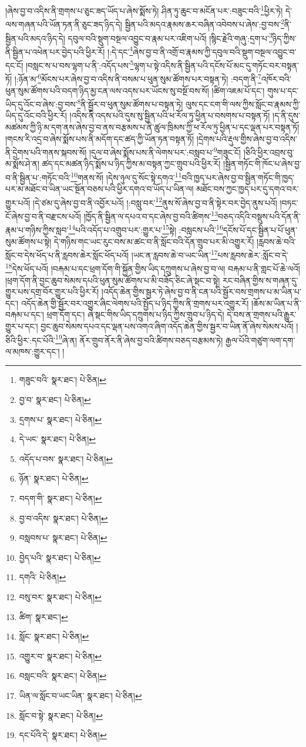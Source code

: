 །ཞེས་བྱ་བ་འདིས་ནི་གྲགས་པ་ཅུང་ཟད་ཡོད་པ་ཞེས་སྨོས་ཏེ། ཤིན་ཏུ་ཆུང་བ་མངོན་པར་:བཟུང་བའི་\footnote{གཟུང་བའི་  སྣར་ཐང་།  པེ་ཅིན། }ཕྱིར་ཏེ། དེ་ལས་གཞན་པའི་ཡོན་ཏན་ནི་ཅུང་ཟད་ཉིད་དེ། སྦྱིན་པའི་མདའ་རྣམས་ཆར་བཞིན་འབེབས་པ་ཞེས་:བྱ་བས་\footnote{བྱ་བ་  སྣར་ཐང་།  པེ་ཅིན། }ནི་སྦྱིན་པའི་མདའ་ཉིད་དེ། དབུལ་བའི་སྡུག་བསྔལ་འབྱུང་བ་རྣམ་པར་འཇིག་པའོ། །སྙིང་རྗེའི་གཞུ་:དྲག་པ་\footnote{དྲགས་པ་  སྣར་ཐང་།  པེ་ཅིན། }ཉིད་ཀྱིས་ནི་སྦྱིན་པ་འཕེན་པར་བྱེད་པའི་ཕྱིར་རོ། །:དེ་དང་\footnote{དེ་ཡང་  སྣར་ཐང་།  པེ་ཅིན། }ཞེས་བྱ་བ་ནི་འགྲོ་བ་རྣམས་ཀྱི་དབུལ་བའི་སྡུག་བསྔལ་འབྱུང་བ་དང་ངོ། །བསླང་ས་པ་བས་ལྷག་པ་ནི་:འདོད་པས་\footnote{འདོད་པ་བས་  སྣར་ཐང་།  པེ་ཅིན། }ལྷག་པ་སྟེ་འདིས་ནི་སྦྱིན་པའི་དངོས་པོ་མང་དུ་གཏོང་བར་བསྟན་ཏོ། །:ཉོན་མ་\footnote{ཉོན་  སྣར་ཐང་།  པེ་ཅིན། }མོངས་པར་ཞེས་བྱ་བ་འདིས་ནི་བསམ་པ་ཕུན་སུམ་ཚོགས་པར་བསྟན་ཏེ། :བདག་ནི་\footnote{བདག་གི་  སྣར་ཐང་།  པེ་ཅིན། }འཁོར་བའི་ཕུན་སུམ་ཚོགས་པའི་བདག་ཉིད་མྱ་ངན་ལས་འདས་པར་ཡོངས་སུ་བསྔོ་བས་སོ། །ཚིག་འཇམ་པོ་དང་། གུས་པ་དང་ཡིད་དུ་འོང་བ་ཞེས་:བྱ་བས་\footnote{བྱ་བ་འདིས་  སྣར་ཐང་།  པེ་ཅིན། }ནི་སྦྱོར་བ་ཕུན་སུམ་ཚོགས་པ་བསྟན་ཏེ། ལུས་དང་ངག་གི་ལས་ཀྱིས་སློང་བ་རྣམས་ཀྱི་ཡིད་དུ་འོང་བའི་ཕྱིར་རོ། །འདིས་ནི་འདས་པའི་དུས་སུ་སྦྱིན་པའི་ཕ་རོལ་ཏུ་ཕྱིན་པ་བསགས་པ་བསྟན་ཏོ། །ད་ནི་དུས་མཚམས་ཀྱི་ཉི་མ་དག་ནས་ཞེས་བྱ་བ་ནས་བརྩམས་པ་ནི་ཚུལ་ཁྲིམས་ཀྱི་ཕ་རོལ་ཏུ་ཕྱིན་པ་དང་ལྡན་པར་བསྟན་ཏོ། །གངས་རི་འདྲ་བ་ཞེས་སྨོས་པས་ནི་མདོག་དང་ཚད་ཀྱི་ཡོན་ཏན་བསྟན་ཏོ། །དྲེགས་པའི་རྡུལ་གྱིས་ཞེས་བྱ་བ་འདིས་ནི་དྲེགས་པའི་གནས་སྐབས་སོ། །དུལ་བ་ཞེས་སྨོས་པས་ནི་ལེགས་པར་:བསླབ་པ་\footnote{བསླབས་པ་  སྣར་ཐང་།  པེ་ཅིན། }གཟུང་ངོ། །ཅིའི་ཕྱིར་འབྲས་བུ་མ་སྨོས་ཤེ་ན། ཚད་དང་མཚན་ཉིད་སྨོས་པ་ཉིད་ཀྱིས་མ་བསྟན་ཀྱང་གྲུབ་པའི་ཕྱིར་རོ། །སྦྱིན་གཏོང་གི་ཁོང་པ་ཞེས་བྱ་བ་ནི་སྦྱིན་པ་:གཏོང་བའི་\footnote{བྱེད་པའི་  སྣར་ཐང་།  པེ་ཅིན། }གནས་སོ། །དེས་ཉུལ་དུ་སོང་སྟེ་དགའ་\footnote{དགའི་  པེ་ཅིན། }བའི་ཁྱད་པར་ཞེས་བྱ་བ་སྦྱིན་གཏོང་གི་ཁྱད་པར་མ་མཐོང་བ་ཡིན་ཡང་སྔོན་བཅས་པའི་ཕྱིར་དགའ་བ་ཡོད་པ་ཡིན་ལ། མཐོང་བས་ཀྱང་ཁྱད་པར་དུ་དགའ་བར་གྱུར་པའོ། །དེ་ཙམ་དུ་ཞེས་བྱ་བ་ནི་འབྱོར་པའོ། །:བསླུ་བར་\footnote{བསུ་བར་  སྣར་ཐང་།  པེ་ཅིན། }ནུས་སོ་ཞེས་བྱ་བ་ནི་སྟེར་བར་བྱེད་ནུས་པའོ། །བཏང་ངོ་ཞེས་བྱ་བ་ནི་བརྫངས་པའོ། །ཁྱོད་ནི་སྦྱིན་ལ་དཔའ་བ་དང་ཞེས་བྱ་བའི་ཚིགས་\footnote{ཚིག་  སྣར་ཐང་། }བཅད་འདིའི་བསྡུས་པའི་དོན་ནི་རྣམ་པ་གཉིས་ཀྱིས་སླབ་\footnote{སློང་  སྣར་ཐང་།  པེ་ཅིན། }པའི་འདོད་པ་འགྲུབ་པར་:གྱུར་པ་\footnote{འགྱུར་བ་  སྣར་ཐང་།  པེ་ཅིན། }སྟེ། :བསླངས་པའི་\footnote{བསླང་བའི་  སྣར་ཐང་།  པེ་ཅིན། }དངོས་པོ་དང་སྦྱིན་པ་པོ་ཕུན་སུམ་ཚོགས་པ་སྟེ། དེ་གཉིས་གང་ཡང་རུང་བས་མ་ཚང་བ་ནི་སློང་བའི་དོན་གྲུབ་པར་མི་འགྱུར་རོ། །རླབས་ཆེ་བའི་སློང་བ་དེས་ཕོད་པ་ནི་རླབས་ཆེར་སློང་ཕོད་པའོ། །ཡང་ན་རླབས་ཆེ་བ་ཡང་ཡིན་\footnote{ཡིན་ལ་སློང་བ་ཡང་ཡིན་  སྣར་ཐང་།  པེ་ཅིན། }པས་རླབས་ཆེར་:སློང་བ་དེ་\footnote{སློང་བ་སྟེ་  སྣར་ཐང་།  པེ་ཅིན། }དེས་ཕོད་པའོ། །བརྐམ་པ་དང་ཕྲག་དོག་གི་སྐྱོན་གྱིས་ཡིད་དཀྲུགས་པ་ཞེས་བྱ་བ་ལ། བརྐམ་པ་ནི་གླང་པོ་ཆེ་ལའོ། །ཕྲག་དོག་ནི་བྱང་ཆུབ་སེམས་དཔའི་ཕུན་སུམ་ཚོགས་པ་མི་བཟོད་ཅིང་ཞེ་སྡང་བ་སྟེ། རང་བཞིན་གྱིས་ས་གཞན་དུ་གྱུར་པས་དགྲ་བོར་གྱུར་པའི་ཕྱིར་རོ། །འདོད་ཆེན་གྱིས་སྦྱར་ཏེ་ཞེས་བྱ་བ་ནི་ངན་པའི་སྦྱོར་བས་གྲགས་པ་མ་ཡིན་པ་དང་། འདོད་ཆེན་གྱི་སྦྱོར་བར་འགྱུར་ཞིང་ལེགས་པའི་སྤྱོད་པ་ཉིད་ཀྱིས་ནི་གྲགས་པར་འགྱུར་རོ། །ཆོས་མ་ཡིན་པ་ནི་བརྐམ་པ་དང་། ཕྲག་དོག་དང་། ཞེ་སྡང་གིས་ཡིད་དཀྲུགས་པ་ཉིད་ཀྱིས་གྲུབ་པ་ཉིད་དེ། དེ་བས་ན་གྲགས་པའི་རྒྱུར་གྱུར་པ་དང་། བྱང་ཆུབ་སེམས་དཔའ་དང་ལྡན་པས་འགའ་ཞིག་འདོད་ཆེན་གྱིས་སྦྱར་བ་ཡིན་ནོ་ཞེས་སེམས་པའོ། །ཅིའི་ཕྱིར་:དང་པོའི་\footnote{དང་པོའི་དེ་  སྣར་ཐང་།  པེ་ཅིན། }ཞེ་ན། ནོར་གྲུབ་ནོར་ནི་ཞེས་བྱ་བའི་ཚིགས་བཅད་བརྩམས་ཏེ། རྒྱལ་པོའི་གཙུག་ལག་དག་ལ་མཁས་:གྱུར་དང་། །

